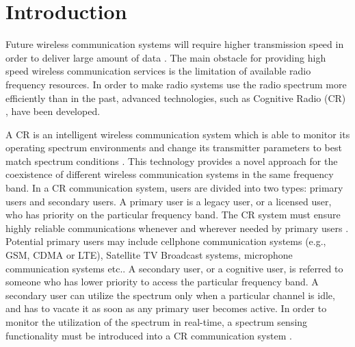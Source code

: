 \chapter{Introduction}
Future wireless communication systems will require higher transmission speed in order to deliver large amount of data \cite{pelcat2012physical}. The main obstacle for providing high speed wireless communication services is the limitation of available radio frequency resources. In order to make radio systems use the radio spectrum more efficiently than in the past, advanced technologies, such as Cognitive Radio (CR) \cite{federal2005notice}, have been developed.  

A CR is an intelligent wireless communication system which is able to monitor its operating spectrum environments and change its transmitter parameters to best match spectrum conditions \cite{wang2011advances, a001}. This technology provides a novel approach for the coexistence of different wireless communication systems in the same frequency band. In a CR communication system, users are divided into two types: primary users and secondary users. A primary user is a legacy user, or a licensed user, who has priority on the particular frequency band. The CR system must ensure highly reliable communications whenever and wherever needed by primary users \cite{a001}. Potential primary users may include cellphone communication systems (e.g., GSM, CDMA or LTE), Satellite TV Broadcast systems, microphone communication systems etc.. A secondary user, or a cognitive user, is referred to someone who has lower priority to access the particular frequency band. A secondary user can utilize the spectrum only when a particular channel is idle, and has to vacate it as soon as any primary user becomes active. 
In order to monitor the utilization of the spectrum in real-time, a spectrum sensing functionality must be introduced into a CR communication system \cite{buddhikot2007understanding, tandra2009spectrum}.   

